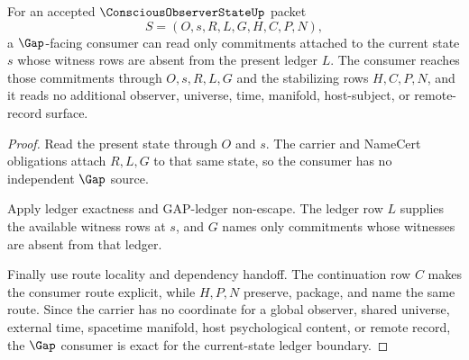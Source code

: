 \begin{theorem}
\label{thm:conscious-observer-state-gap-consumer-exactness}
For an accepted $\ConsciousObserverStateUp$ packet
$$
S=(O,s,R,L,G,H,C,P,N),
$$
a $\Gap$-facing consumer can read only commitments attached to the current state $s$ whose witness rows are absent from the present ledger $L$. The consumer reaches those commitments through $O,s,R,L,G$ and the stabilizing rows $H,C,P,N$, and it reads no additional observer, universe, time, manifold, host-subject, or remote-record surface.
\end{theorem}
\begin{proof}
Read the present state through $O$ and $s$. The carrier and NameCert obligations attach $R,L,G$ to that same state, so the consumer has no independent $\Gap$ source.

Apply ledger exactness and GAP-ledger non-escape. The ledger row $L$ supplies the available witness rows at $s$, and $G$ names only commitments whose witnesses are absent from that ledger.

Finally use route locality and dependency handoff. The continuation row $C$ makes the consumer route explicit, while $H,P,N$ preserve, package, and name the same route. Since the carrier has no coordinate for a global observer, shared universe, external time, spacetime manifold, host psychological content, or remote record, the $\Gap$ consumer is exact for the current-state ledger boundary.
\end{proof}

